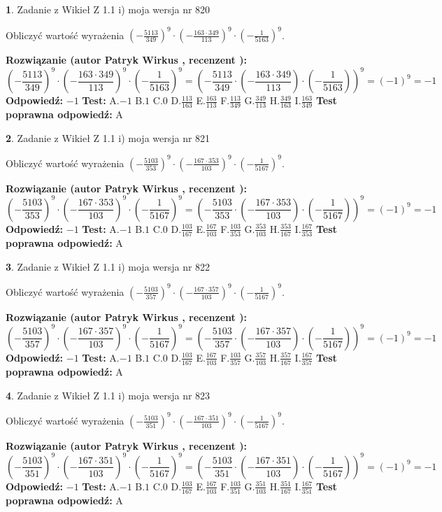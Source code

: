 \documentclass[12pt, a4paper]{article}
\theoremstyle{definition} %
\newtheorem{zad}{}
\newcommand{\zadStart}[1]{\begin{zad}#1\newline}
\newcommand{\zadStop}{\end{zad}}
\newcommand{\rozwStart}[2]{\noindent \textbf{Rozwiązanie (autor #1 , recenzent #2): }\newline}
\newcommand{\rozwStop}{\newline}
\newcommand{\odpStart}{\noindent \textbf{Odpowiedź:}\newline}
\newcommand{\odpStop}{\newline}
\newcommand{\testStart}{\noindent \textbf{Test:}\newline}
\newcommand{\testStop}{\newline}
\newcommand{\kluczStart}{\noindent \textbf{Test poprawna odpowiedź:}\newline}
\newcommand{\kluczStop}{\newline}
\begin{document}
\zadStart{Zadanie z Wikieł Z 1.1 i) moja wersja nr 820}

Obliczyć wartość wyrażenia $(-\frac{5113}{349})^{9} \cdot (-\frac{163 \cdot 349}{113})^{9} \cdot (-\frac{1}{5163})^{9}$.
\zadStop
\rozwStart{Patryk Wirkus}{}
$$(-\frac{5113}{349})^{9} \cdot (-\frac{163 \cdot 349}{113})^{9} \cdot (-\frac{1}{5163})^{9} = (-\frac{5113}{349} \cdot (-\frac{163 \cdot 349}{113}) \cdot (-\frac{1}{5163}))^{9} = (-1)^{9} = -1$$
\rozwStop
\odpStart
$-1$
\odpStop
\testStart
A.$-1$ B.$1$ C.$0$ D.$\frac{113}{163}$ E.$\frac{163}{113}$
F.$\frac{113}{349}$ G.$\frac{349}{113}$
H.$\frac{349}{163}$
I.$\frac{163}{349}$
\testStop
\kluczStart
A
\kluczStop



\zadStart{Zadanie z Wikieł Z 1.1 i) moja wersja nr 821}

Obliczyć wartość wyrażenia $(-\frac{5103}{353})^{9} \cdot (-\frac{167 \cdot 353}{103})^{9} \cdot (-\frac{1}{5167})^{9}$.
\zadStop
\rozwStart{Patryk Wirkus}{}
$$(-\frac{5103}{353})^{9} \cdot (-\frac{167 \cdot 353}{103})^{9} \cdot (-\frac{1}{5167})^{9} = (-\frac{5103}{353} \cdot (-\frac{167 \cdot 353}{103}) \cdot (-\frac{1}{5167}))^{9} = (-1)^{9} = -1$$
\rozwStop
\odpStart
$-1$
\odpStop
\testStart
A.$-1$ B.$1$ C.$0$ D.$\frac{103}{167}$ E.$\frac{167}{103}$
F.$\frac{103}{353}$ G.$\frac{353}{103}$
H.$\frac{353}{167}$
I.$\frac{167}{353}$
\testStop
\kluczStart
A
\kluczStop



\zadStart{Zadanie z Wikieł Z 1.1 i) moja wersja nr 822}

Obliczyć wartość wyrażenia $(-\frac{5103}{357})^{9} \cdot (-\frac{167 \cdot 357}{103})^{9} \cdot (-\frac{1}{5167})^{9}$.
\zadStop
\rozwStart{Patryk Wirkus}{}
$$(-\frac{5103}{357})^{9} \cdot (-\frac{167 \cdot 357}{103})^{9} \cdot (-\frac{1}{5167})^{9} = (-\frac{5103}{357} \cdot (-\frac{167 \cdot 357}{103}) \cdot (-\frac{1}{5167}))^{9} = (-1)^{9} = -1$$
\rozwStop
\odpStart
$-1$
\odpStop
\testStart
A.$-1$ B.$1$ C.$0$ D.$\frac{103}{167}$ E.$\frac{167}{103}$
F.$\frac{103}{357}$ G.$\frac{357}{103}$
H.$\frac{357}{167}$
I.$\frac{167}{357}$
\testStop
\kluczStart
A
\kluczStop



\zadStart{Zadanie z Wikieł Z 1.1 i) moja wersja nr 823}

Obliczyć wartość wyrażenia $(-\frac{5103}{351})^{9} \cdot (-\frac{167 \cdot 351}{103})^{9} \cdot (-\frac{1}{5167})^{9}$.
\zadStop
\rozwStart{Patryk Wirkus}{}
$$(-\frac{5103}{351})^{9} \cdot (-\frac{167 \cdot 351}{103})^{9} \cdot (-\frac{1}{5167})^{9} = (-\frac{5103}{351} \cdot (-\frac{167 \cdot 351}{103}) \cdot (-\frac{1}{5167}))^{9} = (-1)^{9} = -1$$
\rozwStop
\odpStart
$-1$
\odpStop
\testStart
A.$-1$ B.$1$ C.$0$ D.$\frac{103}{167}$ E.$\frac{167}{103}$
F.$\frac{103}{351}$ G.$\frac{351}{103}$
H.$\frac{351}{167}$
I.$\frac{167}{351}$
\testStop
\kluczStart
A
\kluczStop
\end{document}
